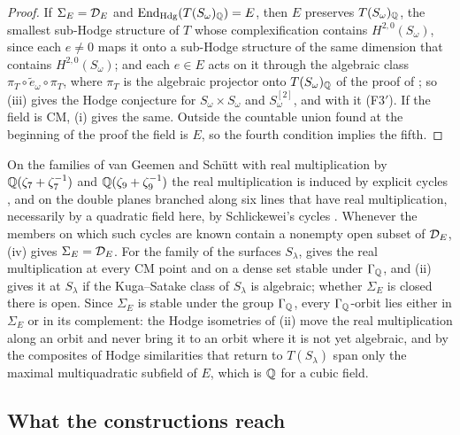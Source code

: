 \begin{proof}
If $\Sigma_{E}=\mathcal{D}_{E}$ and $\operatorname{End}_{\mathrm{Hdg}}(T(S_{\omega})_{\mathbb{Q}})=E$, then
$E$ preserves $T(S_{\omega})_{\mathbb{Q}}$, the smallest sub-Hodge structure of $T$
whose complexification contains $H^{2,0}(S_{\omega})$, since each $e\ne0$
maps it onto a sub-Hodge structure of the same dimension that contains
$H^{2,0}(S_{\omega})$; and each $e\in E$ acts
on it through the algebraic class $\pi_{T}\circ\tilde e_{\omega}\circ\pi_{T}$,
where $\pi_{T}$ is the algebraic projector onto $T(S_{\omega})_{\mathbb{Q}}$ of the
proof of ; so (iii) gives the Hodge
conjecture for $S_{\omega}\times S_{\omega}$ and $S_{\omega}^{[2]}$, and with
it \textup{(F3$'$)}. If the field is CM, (i) gives the
same. Outside the countable union found at the beginning of the proof the
field is $E$, so the fourth condition implies the fifth.
\end{proof}

On the families of van Geemen and Sch\"utt with real multiplication by
$\mathbb{Q}(\zeta_{7}+\zeta_{7}^{-1})$ and $\mathbb{Q}(\zeta_{9}+\zeta_{9}^{-1})$ the
real multiplication is induced by explicit cycles \cite[Theorem~1.2 and
Section~4.8]{vGS25}, and on the double planes branched along six lines that
have real multiplication, necessarily by a quadratic field here, by
Schlickewei's cycles \cite{Sch10,vG08}. Whenever the members on which such
cycles are known contain a nonempty open subset of $\mathcal{D}_{E}$, (iv) gives
$\Sigma_{E}=\mathcal{D}_{E}$. For the family of the surfaces $S_{\lambda}$,
 gives the real multiplication at every CM point and on a
dense set stable under $\Gamma_{\mathbb{Q}}$, and (ii) gives it
at $S_{\lambda}$ if the Kuga--Satake class of $S_{\lambda}$ is algebraic;
whether $\Sigma_{E}$ is closed there is open. Since $\Sigma_{E}$ is stable
under the group $\Gamma_{\mathbb{Q}}$, every $\Gamma_{\mathbb{Q}}$-orbit lies either in
$\Sigma_{E}$ or in its complement: the Hodge isometries of (ii) move the real
multiplication along an orbit and never bring it to an orbit where it is not
yet algebraic, and by  the composites of Hodge
similarities that return to $T(S_{\lambda})$ span only the maximal
multiquadratic subfield of $E$, which is $\mathbb{Q}$ for a cubic field.

\subsection{What the constructions reach}\label{ssec:reach}

